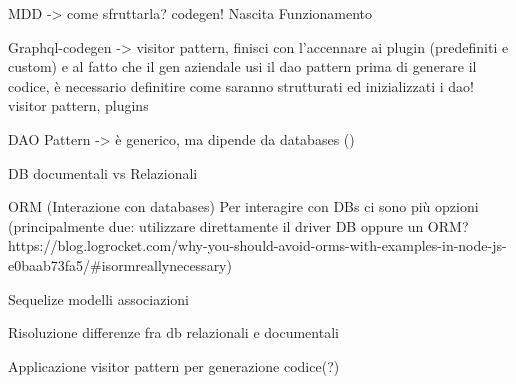     
    MDD -> come sfruttarla? codegen!
        Nascita
        Funzionamento


    Graphql-codegen -> visitor pattern, finisci con l'accennare ai plugin (predefiniti e custom) e al fatto che il gen aziendale usi il dao pattern
                        prima di generare il codice, è necessario definitire come saranno strutturati ed inizializzati i dao!
        visitor pattern,
        plugins

    DAO Pattern -> è generico, ma dipende da databases ()
    
    DB documentali vs Relazionali
    
    ORM (Interazione con databases)
        Per interagire con DBs ci sono più opzioni (principalmente due: utilizzare direttamente il driver DB oppure un ORM? https://blog.logrocket.com/why-you-should-avoid-orms-with-examples-in-node-js-e0baab73fa5/#isormreallynecessary) 

    Sequelize
        modelli
        associazioni

    Risoluzione differenze fra db relazionali e documentali

    Applicazione visitor pattern per generazione codice(?)



